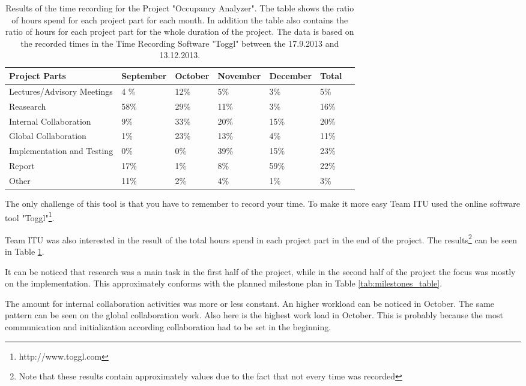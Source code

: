 \begin{table}[htb]
	\centering
	\begin{tabular}{ |  p{} |  p{2cm} |  p{2cm} |  p{2cm} |  p{2cm} |  p{2cm} |  p{2cm}|}
    		\hline
   		Project Parts & September & October & November & December & Total\\ \hline
    		Lectures/Advisory Meetings & 4 \% & 12\% & 5\% & 3\% & 5\% \\ \hline
    		Reasearch & 58\% & 29\% & 11\% & 3\% & 16\% \\ \hline
		Internal Collaboration & 9\% & 33\% & 20\% & 15\% & 20\%\\ \hline
    		Global Collaboration & 1\% & 23\% & 13\% & 4\% & 11\%\\ \hline
    		Implementation and Testing & 0\% & 0\% & 39\% & 15\% & 23\% \\ \hline
    		Report & 17\% & 1\%  & 8\% & 59\% & 22\% \\ \hline
 		Other & 11\% & 2\% & 4\% & 1\% & 3\%\\ \hline
	\end{tabular}
	\caption{Results of the time recording for the Project "Occupancy Analyzer". The table shows the ratio of hours spend for each project part for each month. In addition the table also contains the ratio of hours for each project part for the whole duration of the project. The data is based on the recorded times in the Time Recording Software "Toggl" between the 17.9.2013 and 13.12.2013.}
	\label{tab:timeRecResults}
\end{table}

The only challenge of this tool is that you have to remember to record your time. To make it more easy Team ITU used the online software tool "Toggl"\footnote{http://www.toggl.com}.

Team ITU was also interested in the result of the total hours spend in each project part in the end of the project. The results\footnote{Note that these results contain approximately values due to the fact that not every time was recorded} can be seen in Table \ref{tab:timeRecResults}.

It can be noticed that research was a main task in the first half of the project, while in the second half of the project the focus was mostly on the implementation. This approximately conforms with the planned milestone plan in Table \ref{tab:milestones_table}.

The amount for internal collaboration activities was more or less constant. An higher workload can be noticed in October. The same pattern can be seen on the global collaboration work. Also here is the highest work load in October. This is probably because the most communication and initialization according collaboration had to be set in the beginning.

